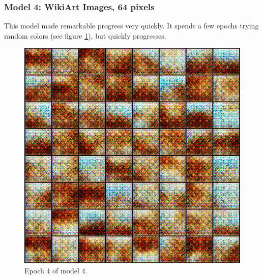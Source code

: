 \documentclass[11pt,letterpaper]{article}
\begin{document}
			\subsubsection{Model 4: WikiArt Images, 64 pixels}
				This model made remarkable progress very quickly.
				It spends a few epochs trying random colors (see figure \ref{fig:wa64:epoch004generator}), but quickly progresses.
				\begin{figure}
					\centering
					\includegraphics[width=1.0\linewidth]{results/model4/epoch004_generator}
					\caption{Epoch 4 of model 4.}
					\label{fig:wa64:epoch004generator}
				\end{figure}
\end{document}
